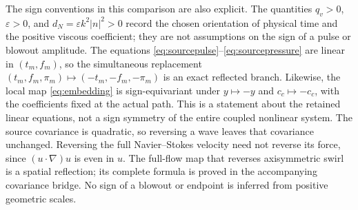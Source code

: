 \documentclass[11pt]{article}
\begin{document}
The sign conventions in this comparison are also explicit.  The quantities
$q_v>0$, $\varepsilon>0$, and $d_N=\varepsilon k^2|n|^2>0$ record the chosen
orientation of physical time and the positive viscous coefficient; they are
not assumptions on the sign of a pulse or blowout amplitude.  The equations
\eqref{eq:sourcepulse}--\eqref{eq:sourcepressure} are linear in $(t_m,f_m)$,
so the simultaneous replacement $(t_m,f_m,\pi_m)\mapsto
(-t_m,-f_m,-\pi_m)$ is an exact reflected branch.  Likewise, the local map
\eqref{eq:embedding} is sign-equivariant under $y\mapsto-y$ and
$c_c\mapsto-c_c$, with the coefficients fixed at the actual path.
This is a statement about the retained linear equations, not a sign symmetry
of the entire coupled nonlinear system.
The source covariance is quadratic, so reversing a wave leaves that
covariance unchanged. Reversing the full Navier--Stokes velocity need not
reverse its force, since $(u\cdot\nabla)u$ is even in $u$.
The full-flow map that reverses axisymmetric swirl is a spatial reflection;
its complete formula is proved in the accompanying covariance bridge.
No sign of a blowout or endpoint is inferred from positive geometric scales.
\end{document}
